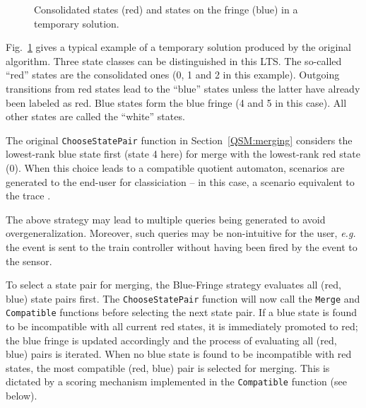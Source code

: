 \begin{figure}
\centering
{}
\caption{Consolidated states (red) and states on the fringe (blue) in a temporary solution\label{Fig:BlueFringe}.}
\end{figure}

Fig.~\ref{Fig:BlueFringe} gives a typical example of a temporary solution produced by the original algorithm. Three state classes can be distinguished in this LTS. The so-called ``red'' states are the consolidated ones (0, 1 and 2 in this example). Outgoing transitions from red states lead to the ``blue'' states unless the latter have already been labeled as red. Blue states form the blue fringe (4 and 5 in this case). All other states are called the ``white'' states. 

The original \texttt{ChooseStatePair} function in Section~\ref{QSM:merging} considers the lowest-rank blue state first (state 4 here) for merge with the lowest-rank red state (0). When this choice leads to a compatible quotient automaton, scenarios are generated to the end-user for classiciation -- in this case, a scenario equivalent to the trace . 

The above strategy may lead to multiple queries being generated to avoid overgeneralization. Moreover, such queries may be non-intuitive for the user, \textit{e.g.} the  event is sent to the train controller without having been fired by the  event to the sensor.

To select a state pair for merging, the Blue-Fringe strategy evaluates all (red, blue) state pairs first. The \texttt{ChooseStatePair} function will now call the \texttt{Merge} and \texttt{Compatible} functions before selecting the next state pair. If a blue state is found to be incompatible with all current red states, it is immediately promoted to red; the blue fringe is updated accordingly and the process of evaluating all (red, blue) pairs is iterated. When no blue state is found to be incompatible with red states, the most compatible (red, blue) pair is selected for merging. This is dictated by a scoring mechanism implemented in the \texttt{Compatible} function (see below).

